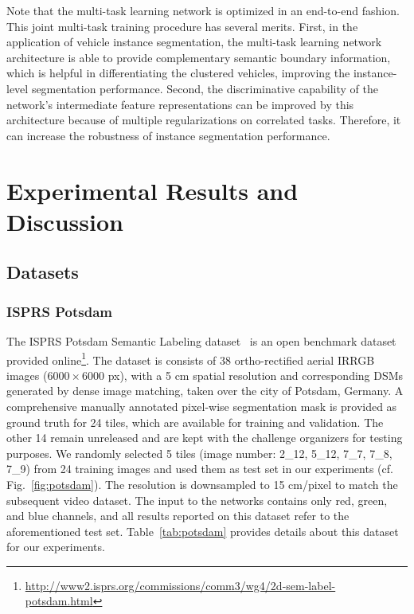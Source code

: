 \documentclass[journal]{IEEEtran}
\begin{document}
\par
Note that the multi-task learning network is optimized in an end-to-end fashion. This joint multi-task training procedure has several merits. First, in the application of vehicle instance segmentation, the multi-task learning network architecture is able to provide complementary semantic boundary information, which is helpful in differentiating the clustered vehicles, improving the instance-level segmentation performance. Second, the discriminative capability of the network's intermediate feature representations can be improved by this architecture because of multiple regularizations on correlated tasks. Therefore, it can increase the robustness of instance segmentation performance.


\section{Experimental Results and Discussion}
\label{sec:exp}
\subsection{Datasets}
\subsubsection{\textbf{ISPRS Potsdam}}
The ISPRS Potsdam Semantic Labeling dataset~\cite{potsdam} is an open benchmark dataset provided online\footnote{\url{http://www2.isprs.org/commissions/comm3/wg4/2d-sem-label-potsdam.html}}. The dataset is consists of 38 ortho-rectified aerial IRRGB images ($6000\times6000$ px), with a 5 cm spatial resolution and corresponding DSMs generated by dense image matching, taken over the city of Potsdam, Germany. A comprehensive manually annotated pixel-wise segmentation mask is provided as ground truth for 24 tiles, which are available for training and validation. The other 14 remain unreleased and are kept with the challenge organizers for testing purposes. We randomly selected 5 tiles (image number: 2\_12, 5\_12, 7\_7, 7\_8, 7\_9) from 24 training images and used them as test set in our experiments (cf. Fig.~\ref{fig:potsdam}). The resolution is downsampled to 15 cm/pixel to match the subsequent video dataset. The input to the networks contains only red, green, and blue channels, and all results reported on this dataset refer to the aforementioned test set. Table~\ref{tab:potsdam} provides details about this dataset for our experiments.
\end{document}
